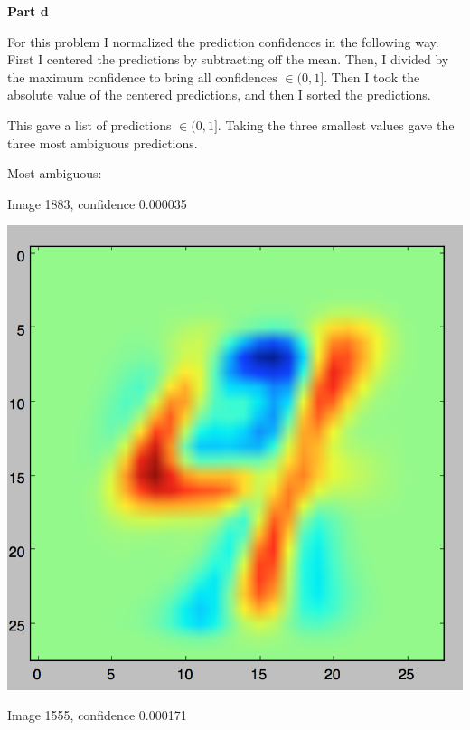 \documentclass[twoside,11pt]{homework}
\begin{document}
\textbf{Part d}

For this problem I normalized the prediction confidences in the following way.
First I centered the predictions by subtracting off the mean.
Then, I divided by the maximum confidence to bring all confidences $\in (0, 1]$.
Then I took the absolute value of the centered predictions, and then I sorted the predictions.

This gave a list of predictions $\in (0, 1]$. Taking the three  smallest values gave the three most ambiguous predictions.

Most ambiguous:

Image 1883, confidence 0.000035

\includegraphics[scale=.5]{images/1883.png}

Image 1555, confidence 0.000171
\end{document}
